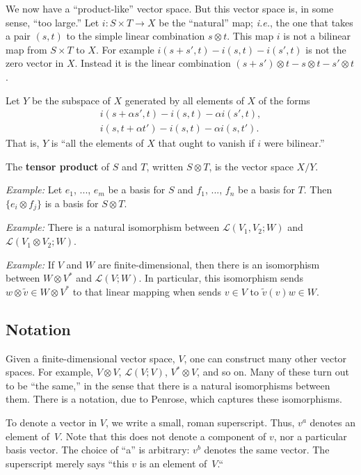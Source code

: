 \documentclass[10pt, a4paper, twocolumn]{article}
\newcommand{\defn}[1]{\textbf{#1}}
\begin{document}
We now have a “product-like” vector space. But this vector space is, in some
sense, “too large.” Let $i: S\times T\to X$ be the “natural” map; \emph{i.e.}, the one
that takes a pair $(s,t)$ to the simple linear combination $s\otimes t$. This map $i$
is not a bilinear map from $S\times T$ to $X$. For example $i(s + s',t) - i(s,t) -
i(s',t)$ is not the zero vector in $X$. Instead it is the linear combination
$(s+s')\otimes t - s\otimes t - s'\otimes t$.

Let $Y$ be the subspace of $X$ generated by all elements of $X$ of the forms
\begin{gather*}
  i(s + \alpha s', t) - i(s,t) - \alpha i(s', t), \\
  i(s, t + \alpha t') - i(s,t) - \alpha i(s, t').
\end{gather*}
That is, $Y$ is “all the elements of $X$ that ought to vanish if $i$ were
bilinear.”

The \defn{tensor product} of $S$ and $T$, written $S\otimes T$, is the vector space
$X/Y$.

\emph{Example:} Let $e_1$, ..., $e_m$ be a basis for $S$ and $f_1$, ..., $f_n$
be a basis for $T$. Then $\{e_i\otimes f_j\}$ is a basis for $S\otimes T$.

\emph{Example:} There is a natural isomorphism between $\mathcal{L}(V_1, V_2;
W)$ and $\mathcal{L}(V_1 \otimes V_2; W)$.

\emph{Example:} If $V$ and $W$ are finite-dimensional, then there is an
isomorphism between $W \otimes V^*$ and $\mathcal{L}(V; W)$. In particular, this
isomorphism sends $w\otimes \tilde{v} \in W\otimes V^*$ to that linear mapping when sends $v\in
V$ to $\tilde{v}(v)w \in W$.

\subsection{Notation} 

Given a finite-dimensional vector space, $V$, one can construct many other
vector spaces. For example, $V\otimes V$, $\mathcal{L}(V;V)$, $V^*\otimes V$, and so
on. Many of these turn out to be “the same,” in the sense that there is a
natural isomorphisms between them. There is a notation, due to Penrose, which
captures these isomorphisms.

To denote a vector in $V$, we write a small, roman superscript. Thus, $v^a$
denotes an element of~$V$. Note that this does not denote a component of $v$, nor a
particular basis vector. The choice of “a” is arbitrary: $v^b$ denotes the same
vector. The superscript merely says “this $v$ is an element of~$V$.“
\end{document}
